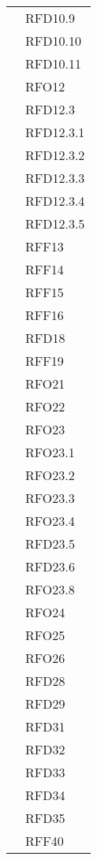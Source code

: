 \begin{longtable}{|>{\centering}m{10cm}|m{3cm}<{\centering}|}
& RFD10.9\\
& RFD10.10\\
& RFD10.11\\
& RFO12\\
& RFD12.3\\
& RFD12.3.1\\
& RFD12.3.2\\
& RFD12.3.3\\
& RFD12.3.4\\
& RFD12.3.5\\
& RFF13\\
& RFF14\\
& RFF15\\
& RFF16\\
& RFD18\\
& RFF19\\
& RFO21\\
& RFO22\\
& RFO23\\
& RFO23.1\\
& RFO23.2\\
& RFO23.3\\
& RFO23.4\\
& RFD23.5\\
& RFD23.6\\
& RFO23.8\\
& RFO24\\
& RFO25\\
& RFO26\\
& RFD28\\
& RFD29\\
& RFD31\\
& RFD32\\
& RFD33\\
& RFD34\\
& RFD35\\
& RFF40\\ \hline


\end{longtable}
